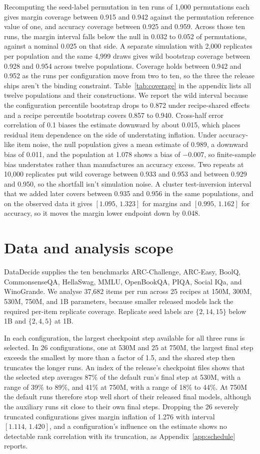 \documentclass{article}
\newcommand{\ci}[2]{\ensuremath{[#1,\,#2]}}
\begin{document}
Recomputing the seed-label permutation in ten runs of 1,000 permutations each gives margin coverage between 0.915 and 0.942 against the permutation reference value of one, and accuracy coverage between 0.925 and 0.959. Across those ten runs, the margin interval falls below the null in 0.032 to 0.052 of permutations, against a nominal 0.025 on that side. A separate simulation with 2,000 replicates per population and the same 4,999 draws gives wild bootstrap coverage between 0.928 and 0.954 across twelve populations. Coverage holds between 0.942 and 0.952 as the runs per configuration move from two to ten, so the three the release ships aren't the binding constraint. Table~\ref{tab:coverage} in the appendix lists all twelve populations and their constructions. We report the wild interval because the configuration percentile bootstrap drops to 0.872 under recipe-shared effects and a recipe percentile bootstrap covers 0.857 to 0.940. Cross-half error correlation of 0.1 biases the estimate downward by about 0.015, which places residual item dependence on the side of understating inflation. Under accuracy-like item noise, the null population gives a mean estimate of 0.989, a downward bias of 0.011, and the population at 1.078 shows a bias of $-0.007$, so finite-sample bias understates rather than manufactures an accuracy excess. Two repeats at 10,000 replicates put wild coverage between 0.933 and 0.953 and between 0.929 and 0.950, so the shortfall isn't simulation noise. A cluster test-inversion interval that we added later covers between 0.935 and 0.956 in the same populations, and on the observed data it gives \ci{1.095}{1.323} for margins and \ci{0.995}{1.162} for accuracy, so it moves the margin lower endpoint down by 0.048.

\section{Data and analysis scope}
DataDecide supplies the ten benchmarks ARC-Challenge, ARC-Easy, BoolQ, CommonsenseQA, HellaSwag, MMLU, OpenBookQA, PIQA, Social IQa, and WinoGrande. We analyse 37,682 items per run across 25 recipes at 150M, 300M, 530M, 750M, and 1B parameters, because smaller released models lack the required per-item replicate coverage. Replicate seed labels are $\{2,14,15\}$ below 1B and $\{2,4,5\}$ at 1B.

In each configuration, the largest checkpoint step available for all three runs is selected. In 26 configurations, one at 530M and 25 at 750M, the largest final step exceeds the smallest by more than a factor of 1.5, and the shared step then truncates the longer runs. An index of the release's checkpoint files shows that the selected step averages 87\% of the default run's final step at 530M, with a range of 39\% to 89\%, and 41\% at 750M, with a range of 18\% to 44\%. At 750M the default runs therefore stop well short of their released final models, although the auxiliary runs sit close to their own final steps. Dropping the 26 severely truncated configurations gives margin inflation of 1.276 with interval \ci{1.114}{1.420}, and a configuration's influence on the estimate shows no detectable rank correlation with its truncation, as Appendix~\ref{app:schedule} reports.
\end{document}

